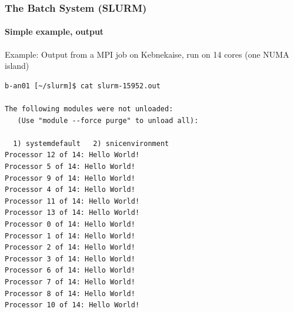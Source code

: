 \documentclass{beamer}
\begin{document}
\begin{frame}[fragile]\frametitle{The Batch System (SLURM)}\framesubtitle{Simple example, output} 

  \begin{block}{}
    \justify
Example: Output from a MPI job on Kebnekaise, run on 14 cores (one NUMA island)
  \end{block}

  \begin{block}{}
\begin{tiny}
\begin{verbatim}
b-an01 [~/slurm]$ cat slurm-15952.out 

The following modules were not unloaded:
   (Use "module --force purge" to unload all):

  1) systemdefault   2) snicenvironment
Processor 12 of 14: Hello World!
Processor 5 of 14: Hello World!
Processor 9 of 14: Hello World!
Processor 4 of 14: Hello World!
Processor 11 of 14: Hello World!
Processor 13 of 14: Hello World!
Processor 0 of 14: Hello World!
Processor 1 of 14: Hello World!
Processor 2 of 14: Hello World!
Processor 3 of 14: Hello World!
Processor 6 of 14: Hello World!
Processor 7 of 14: Hello World!
Processor 8 of 14: Hello World!
Processor 10 of 14: Hello World!
\end{verbatim}
\end{tiny}
  \end{block}

\end{frame}



\end{document}
